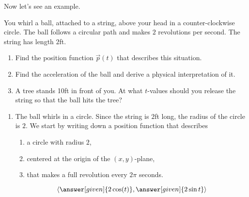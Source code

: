 \documentclass{ximera}
\begin{document}
Now let's see an example.
\begin{example}
  You whirl a ball, attached to a string, above your head in a
  counter-clockwise circle. The ball follows a circular path and makes
  $2$ revolutions per second. The string has length $2$ft.
\begin{enumerate}
\item Find the position function $\vec{p}(t)$ that describes this
  situation.
\item Find the acceleration of the ball and derive a physical
  interpretation of it.
\item A tree stands 10ft in front of you. At what $t$-values should
  you release the string so that the ball hits the tree?
\end{enumerate}
\begin{explanation}
  \begin{enumerate}
  \item The ball whirls in a circle. Since the string is $2$ft long,
    the radius of the circle is $2$. We start by writing down a
    position function that describes
    \begin{enumerate}
    \item a circle with radius $2$,
    \item centered at the origin of the $(x,y)$-plane,
    \item that makes a full revolution every $2\pi$ seconds.
    \end{enumerate}
    \[
    \vector{\answer[given]{2\cos(t)}, \answer[given]{2\sin t}}
    \]
  \end{enumerate}
\end{explanation}
\end{example}
\end{document}
